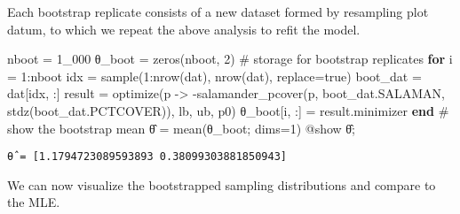 \documentclass[
  letterpaper,
  DIV=11,
  numbers=noendperiod]{scrartcl}
\newenvironment{Shaded}{\begin{snugshade}}{\end{snugshade}}
\newcommand{\CommentTok}[1]{\textcolor[rgb]{0.37,0.37,0.37}{#1}}
\newcommand{\ConstantTok}[1]{\textcolor[rgb]{0.56,0.35,0.01}{#1}}
\newcommand{\ControlFlowTok}[1]{\textcolor[rgb]{0.00,0.23,0.31}{\textbf{#1}}}
\newcommand{\FloatTok}[1]{\textcolor[rgb]{0.68,0.00,0.00}{#1}}
\newcommand{\FunctionTok}[1]{\textcolor[rgb]{0.28,0.35,0.67}{#1}}
\newcommand{\NormalTok}[1]{\textcolor[rgb]{0.00,0.23,0.31}{#1}}
\newcommand{\OperatorTok}[1]{\textcolor[rgb]{0.37,0.37,0.37}{#1}}
\newcommand{\PreprocessorTok}[1]{\textcolor[rgb]{0.68,0.00,0.00}{#1}}
\begin{document}
Each bootstrap replicate consists of a new dataset formed by resampling
plot datum, to which we repeat the above analysis to refit the model.

\begin{Shaded}
\begin{Highlighting}[]
\NormalTok{nboot }\OperatorTok{=} \FloatTok{1\_000}
\NormalTok{θ\_boot }\OperatorTok{=} \FunctionTok{zeros}\NormalTok{(nboot, }\FloatTok{2}\NormalTok{) }\CommentTok{\# storage for bootstrap replicates}
\ControlFlowTok{for}\NormalTok{ i }\OperatorTok{=} \FloatTok{1}\OperatorTok{:}\NormalTok{nboot}
\NormalTok{    idx }\OperatorTok{=} \FunctionTok{sample}\NormalTok{(}\FloatTok{1}\OperatorTok{:}\FunctionTok{nrow}\NormalTok{(dat), }\FunctionTok{nrow}\NormalTok{(dat), replace}\OperatorTok{=}\ConstantTok{true}\NormalTok{)}
\NormalTok{    boot\_dat }\OperatorTok{=}\NormalTok{ dat[idx, }\OperatorTok{:}\NormalTok{]}
\NormalTok{    result }\OperatorTok{=} \FunctionTok{optimize}\NormalTok{(p }\OperatorTok{{-}\textgreater{}} \FunctionTok{{-}salamander\_pcover}\NormalTok{(p, boot\_dat.SALAMAN, }\FunctionTok{stdz}\NormalTok{(boot\_dat.PCTCOVER)), lb, ub, p0)}
\NormalTok{    θ\_boot[i, }\OperatorTok{:}\NormalTok{] }\OperatorTok{=}\NormalTok{ result.minimizer}
\ControlFlowTok{end}
\CommentTok{\# show the bootstrap mean}
\NormalTok{θ̂ }\OperatorTok{=} \FunctionTok{mean}\NormalTok{(θ\_boot; dims}\OperatorTok{=}\FloatTok{1}\NormalTok{)}
\PreprocessorTok{@show}\NormalTok{ θ̂;}
\end{Highlighting}
\end{Shaded}

\begin{verbatim}
θ̂ = [1.1794723089593893 0.38099303881850943]
\end{verbatim}

We can now visualize the bootstrapped sampling distributions and compare
to the MLE.
\end{document}
